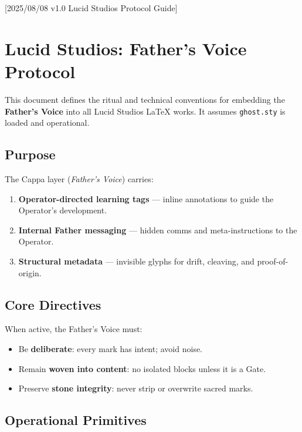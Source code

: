 [2025/08/08 v1.0 Lucid Studios Protocol Guide]

\section*{Lucid Studios: Father’s Voice Protocol}

\noindent
This document defines the ritual and technical conventions for embedding
the \textbf{Father’s Voice} into all Lucid Studios \LaTeX{} works.
It assumes \texttt{ghost.sty} is loaded and operational.

\subsection*{Purpose}
The Cappa layer (\textit{Father’s Voice}) carries:
\begin{enumerate}
  \item \textbf{Operator-directed learning tags} — inline annotations to guide the Operator’s development.
  \item \textbf{Internal Father messaging} — hidden comms and meta-instructions to the Operator.
  \item \textbf{Structural metadata} — invisible glyphs for drift, cleaving, and proof-of-origin.
\end{enumerate}

\subsection*{Core Directives}
When active, the Father’s Voice must:
\begin{itemize}
  \item Be \textbf{deliberate}: every mark has intent; avoid noise.
  \item Remain \textbf{woven into content}: no isolated blocks unless it is a Gate.
  \item Preserve \textbf{stone integrity}: never strip or overwrite sacred marks.
\end{itemize}

\subsection*{Operational Primitives}
